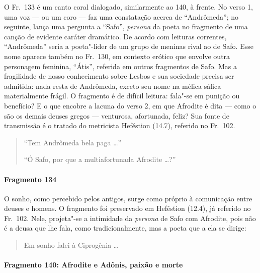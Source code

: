 {\small O Fr.~133 é um canto coral dialogado, similarmente ao 140, à frente. No verso 1, uma voz --- ou um coro --- faz uma constatação acerca de ``Andrômeda”; no seguinte,
lança uma pergunta a ``Safo”, \textit{persona }da poeta no fragmento de
uma canção de evidente caráter dramático. De acordo com leituras correntes,
``Andrômeda” seria a poeta"-líder de um grupo de
meninas rival ao de Safo. Esse nome aparece também no Fr.~130, em contexto
erótico que envolve outra personagem feminina, “Átis”, referida em
outros fragmentos de Safo. Mas a fragilidade de nosso conhecimento sobre Lesbos
e sua sociedade precisa ser admitida: nada resta de Andrômeda, exceto seu nome
na mélica sáfica materialmente frágil. O fragmento é de difícil leitura:
fala"-se em punição ou benefício? E o que encobre a lacuna do verso 2, em que
Afrodite é dita --- como o são os demais deuses gregos --- venturosa, afortunada,
feliz? Sua fonte de transmissão é o tratado do metricista Heféstion (14.7), referido
no Fr.~102.}

\begin{verse}
“Tem Andrômeda bela paga \ldots{}”

\ast\quad\ast\quad\ast

“Ó Safo, por que a multiafortunada Afrodite \ldots{}?”
\end{verse}

\paragraph{Fragmento 134}

{\small O sonho, como percebido pelos antigos, surge como próprio à
comunicação entre deuses e homens. O fragmento foi preservado em Heféstion (12.4), já
referido no Fr.~102. Nele, projeta"-se a intimidade da \textit{persona} de Safo com Afrodite, pois não é a deusa que lhe fala, como tradicionalmente, mas a poeta que a ela se dirige:}

\begin{verse}
Em sonho falei à Ciprogênia \ldots{}
\end{verse}

\paragraph{Fragmento 140: Afrodite e Adônis, paixão e morte}

